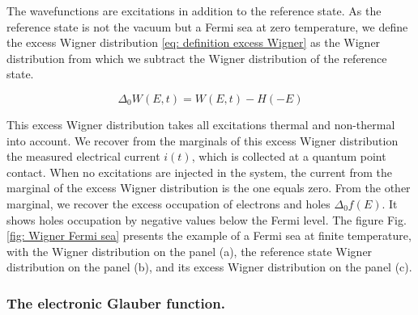 The wavefunctions are excitations in addition to the reference state.
As the reference state is not the vacuum but a Fermi sea at zero temperature, we define the excess Wigner distribution \eqref{eq: definition excess Wigner} as the Wigner distribution from which we subtract the Wigner distribution of the reference state.

\begin{equation}
\Delta_{0}W(E,t) = W(E,t)-H(-E) \label{eq: definition excess Wigner}
\end{equation}

This excess Wigner distribution takes all excitations thermal and non-thermal into account.
We recover from the marginals of this excess Wigner distribution the measured electrical current $i\left(t\right)$, which is collected at a quantum point contact.
When no excitations are injected in the system, the current from the marginal of the excess Wigner distribution is the one equals zero.
From the other marginal, we recover the excess occupation of electrons and holes $\Delta_{0}f\left(E\right)$.
It shows holes occupation by negative values below the Fermi level.
The figure Fig. \ref{fig: Wigner Fermi sea} presents the example of a Fermi sea at finite temperature, with the Wigner distribution on the panel (a), the reference state Wigner distribution on the panel (b), and its excess Wigner distribution on the panel (c).

\subsubsection*{The electronic Glauber function.}

